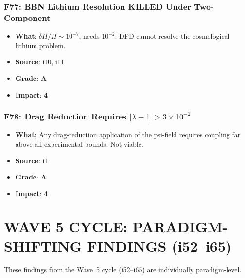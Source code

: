 \documentclass[11pt,a4paper]{article}
\newcommand{\grade}[1]{\textbf{#1}}
\newcommand{\impact}[1]{\textbf{#1}}
\begin{document}
\section{F77: BBN Lithium Resolution KILLED Under Two-Component}
\begin{itemize}[nosep]
\item \textbf{What}: $\delta H/H \sim 10^{-7}$, needs $10^{-2}$. DFD cannot resolve the cosmological lithium problem.
\item \textbf{Source}: i10, i11
\item \textbf{Grade}: \grade{A}
\item \textbf{Impact}: \impact{4}
\end{itemize}

\section{F78: Drag Reduction Requires $|\lambda-1| > 3 \times 10^{-2}$}
\begin{itemize}[nosep]
\item \textbf{What}: Any drag-reduction application of the psi-field requires coupling far above all experimental bounds. Not viable.
\item \textbf{Source}: i1
\item \textbf{Grade}: \grade{A}
\item \textbf{Impact}: \impact{4}
\end{itemize}


\part{WAVE 5 CYCLE: PARADIGM-SHIFTING FINDINGS (i52--i65)}
\label{part:wave5paradigm}

These findings from the Wave~5 cycle (i52--i65) are individually paradigm-level.

\end{document}
